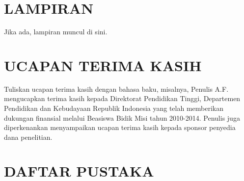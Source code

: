 \documentclass[journal]{IEEEtran}
\theoremstyle{definition}
\theoremstyle{definition}
\theoremstyle{plain}
\begin{document}
    \section*{LAMPIRAN}
    Jika ada, lampiran muncul di sini.
    \section*{UCAPAN TERIMA KASIH}
    Tuliskan ucapan terima kasih dengan bahasa baku, misalnya, Penulis A.F. mengucapkan terima kasih kepada Direktorat Pendidikan Tinggi, Departemen Pendidikan dan Kebudayaan Republik Indonesia yang telah memberikan dukungan finansial melalui Beasiswa Bidik Misi tahun 2010-2014. Penulis juga diperkenankan menyampaikan ucapan terima kasih kepada sponsor penyedia dana penelitian.
    
    \section*{DAFTAR PUSTAKA}
    
    
       
\end{document}
